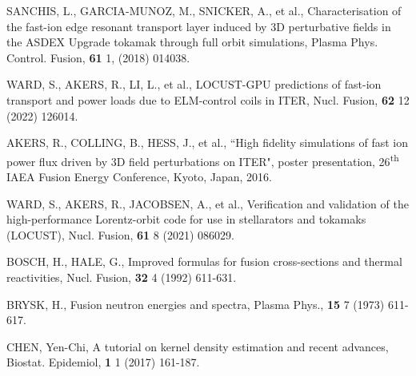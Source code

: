 \documentclass[10pt, a4paper, twoside]{article}
\begin{document}
\begin{thebibliography}{9}
    SANCHIS, L., GARCIA-MUNOZ, M., SNICKER, A., et al.,
    Characterisation of the fast-ion edge resonant transport layer induced by 3D perturbative fields in the ASDEX Upgrade tokamak through full orbit simulations,
    Plasma Phys. Control. Fusion,
    \textbf{61} 1,
    (2018)
    014038.
    
    WARD, S., AKERS, R., LI, L., et al.,
    LOCUST-GPU predictions of fast-ion transport and power loads due to ELM-control coils in ITER,
    Nucl. Fusion,
    \textbf{62} 12
    (2022)
    126014.

    AKERS, R., COLLING, B., HESS, J., et al.,
    ``High fidelity simulations of fast ion power flux driven by 3D field perturbations on ITER",
    poster presentation, 
    26\textsuperscript{th} IAEA Fusion Energy Conference,
    Kyoto, Japan, 
    2016.

    WARD, S., AKERS, R., JACOBSEN, A., et al.,
    Verification and validation of the high-performance Lorentz-orbit code for use in stellarators and tokamaks (LOCUST),
    Nucl. Fusion,
    \textbf{61} 8
    (2021)
    086029.

    BOSCH, H., HALE, G.,
    Improved formulas for fusion cross-sections and thermal reactivities,
    Nucl. Fusion,
    \textbf{32} 4
    (1992)
    611-631.

    BRYSK, H.,
    Fusion neutron energies and spectra,
    Plasma Phys.,
    \textbf{15} 7
    (1973)
    611-617.

    CHEN, Yen-Chi,
    A tutorial on kernel density estimation and recent advances,
    Biostat. Epidemiol,
    \textbf{1} 1
    (2017)
    161-187.


\end{thebibliography}
\end{document}

